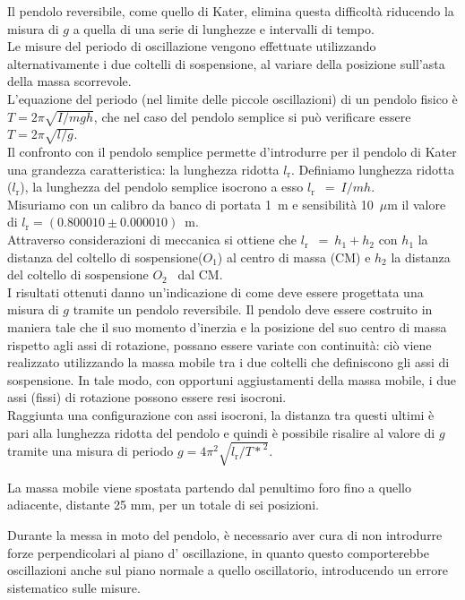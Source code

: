\documentclass[italian, a4paper, 10pt, twocolumn]{../../style/lab_unige}
\newcommand{\Oi}{$O_1$}
\newcommand{\Oii}{$O_2$}
\newcommand{\lr}{$l_{\text{r}}$}
\newcommand{\LrVALUE}{$l_{\text{r}}=(0.800010\pm0.000010)$~m}
\begin{document}
    Il pendolo reversibile, come quello di Kater, elimina questa difficoltà riducendo la misura di $g$ a quella di una serie di lunghezze e intervalli di tempo.\\
    Le misure del periodo di oscillazione vengono effettuate utilizzando alternativamente i due coltelli di sospensione, al variare della posizione sull'asta della massa scorrevole.\\
    L’equazione del periodo (nel limite delle piccole oscillazioni) di un pendolo fisico è $T = 2\pi\sqrt{I/mgh}$, che nel caso del pendolo semplice si può verificare essere $T = 2\pi\sqrt{l/g}$.\\
    Il confronto con il pendolo semplice permette d'introdurre per il pendolo di Kater una grandezza caratteristica: la lunghezza ridotta \lr.
    Definiamo lunghezza ridotta (\lr), la lunghezza del pendolo semplice isocrono a esso \lr~$=~I/mh$. \\
    Misuriamo con un calibro da banco di portata 1~m e sensibilità 10~$\mu$m il valore di \LrVALUE.\\ 
    Attraverso considerazioni di meccanica si ottiene che \lr~$=~h_1+h_2$ con $h_1$ la distanza del coltello di sospensione(\Oi) al centro di massa (CM) e $h_2$ la distanza del coltello di sospensione \Oii~ dal CM.\\
    I risultati ottenuti danno un'indicazione di come deve essere progettata una misura di $g$ tramite un pendolo reversibile.
    Il pendolo deve essere costruito in maniera tale che il suo momento d'inerzia e la posizione del suo centro di massa rispetto agli assi di rotazione, possano essere variate con continuità: ciò viene realizzato utilizzando la massa mobile tra i due coltelli che definiscono gli assi di sospensione.
    In tale modo, con opportuni aggiustamenti della massa mobile, i due assi (fissi) di rotazione possono essere resi isocroni.\\
    Raggiunta una configurazione con assi isocroni, la distanza tra questi ultimi è pari alla lunghezza ridotta del pendolo e quindi è possibile risalire al valore di $g$ tramite una misura di periodo $g=4\pi^2\sqrt{l_{\text{r}}/{T*}^2}$.

    La massa mobile viene spostata partendo dal penultimo foro fino a quello adiacente, distante 25 mm, per un totale di sei posizioni.

    Durante la messa  in moto del pendolo, è necessario aver cura di non introdurre forze perpendicolari al piano d’ oscillazione, in quanto questo comporterebbe oscillazioni anche sul piano normale a quello oscillatorio, introducendo un errore sistematico sulle misure.
\end{document}
